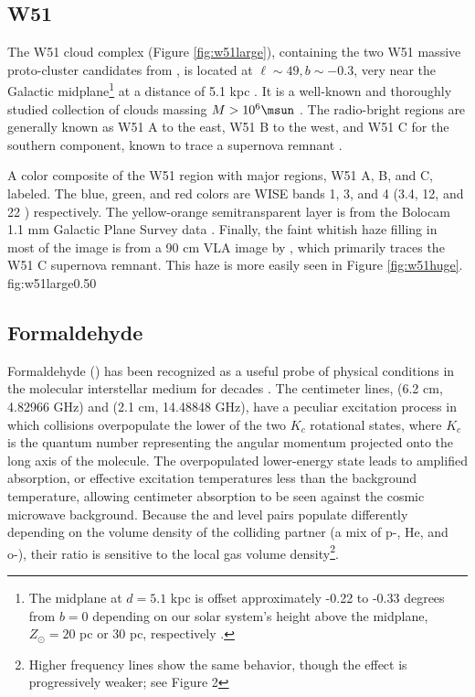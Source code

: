 \subsection{W51}
The W51 cloud complex (Figure \ref{fig:w51large}), containing the two W51
massive proto-cluster candidates from \citet{Ginsburg2012a}, is located at
$\ell\sim49, b\sim-0.3$, very near the Galactic midplane\footnote{The midplane
at $d=5.1$ kpc is offset approximately -0.22 to -0.33 degrees from $b=0$
depending on our solar system's height above the midplane, $Z_\odot = 20$ pc or
30 pc, respectively \citep{Reed2006a,Joshi2007a}.} at a distance of 5.1 kpc
\citep{Sato2010a}.  It is a well-known and thoroughly studied collection of
clouds massing $M>10^6 \msun$
\citep{Carpenter1998a,Bieging2010a,Kang2010a,Parsons2012a}.  The radio-bright
regions are generally known as W51 A to the east, W51 B to the west, and W51 C
for the southern component, known to trace a supernova remnant
\citep{Koo1995a,Brogan2000a,Brogan2013a}.

{A color composite of the W51 region with major regions, W51 A, B, and C,
labeled.  The blue, green, and red colors are WISE bands 1, 3, and 4 (3.4, 12,
and 22 \um) respectively.  The yellow-orange semitransparent layer is from the
Bolocam 1.1 mm Galactic Plane Survey data \citep{Aguirre2011a,Ginsburg2013a}.
Finally, the faint whitish haze filling in most of the image is from a 90 cm
VLA image by \citet{Brogan2013a}, which primarily traces the W51 C supernova
remnant.  This haze is more easily seen in Figure \ref{fig:w51huge}.}
{fig:w51large}{0.5}{0}


\subsection{Formaldehyde}
Formaldehyde (\formaldehyde) has been recognized as a useful probe of physical
conditions in the molecular interstellar medium for decades
\citep{Mangum1993a}.  The centimeter lines, \formaldehyde \oneone (6.2 cm,
4.82966 GHz) and \twotwo (2.1 cm, 14.48848 GHz), have a peculiar excitation
process in which collisions overpopulate the lower of the two $K_c$ rotational
states, where $K_c$ is the quantum number representing the angular momentum
projected onto the long axis of the molecule.  
The overpopulated lower-energy state leads to amplified absorption, or
effective excitation temperatures less than the background temperature,
allowing \formaldehyde centimeter absorption to be seen against the cosmic
microwave background.
Because the \oneone and \twotwo
level pairs populate differently
depending on the volume density of the colliding partner (a mix of p-\hh, He,
and o-\hh), their ratio is sensitive to the local gas volume
density\footnote{Higher frequency
\formaldehyde lines show the same behavior, though the effect is progressively
weaker; see \citet{Darling2012b} Figure 2}.

